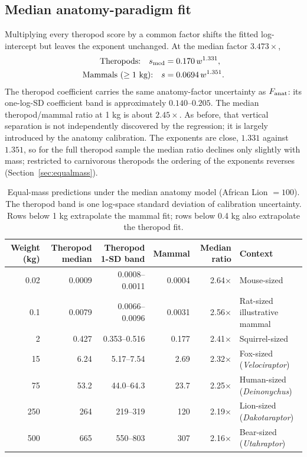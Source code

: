 \documentclass[11pt]{article}
\begin{document}
\subsection{Median anatomy-paradigm fit}
Multiplying every theropod score by a common factor shifts the fitted log-intercept but leaves the exponent unchanged. At the median factor $3.473\times$,
\begin{align}
\text{Theropods:}\quad s_{\rm med} &= 0.170\,w^{1.331}, \\
\text{Mammals ($\geq1$ kg):}\quad s &= 0.0694\,w^{1.351}.
\end{align}
The theropod coefficient carries the same anatomy-factor uncertainty as $F_{\rm anat}$: its one-log-SD coefficient band is approximately $0.140$--$0.205$. The median theropod/mammal ratio at 1 kg is about $2.45\times$. As before, that vertical separation is not independently discovered by the regression; it is largely introduced by the anatomy calibration. The exponents are close, $1.331$ against $1.351$, so for the full theropod sample the median ratio declines only slightly with mass; restricted to carnivorous theropods the ordering of the exponents reverses (Section~\ref{sec:equalmass}).

\begin{table}[H]
\centering
\footnotesize
\setlength{\tabcolsep}{4pt}
\begin{tabular}{rrrrrl}
\toprule
Weight (kg) & Theropod median & Theropod 1-SD band & Mammal & Median ratio & Context \\
\midrule
0.02 & 0.0009 & 0.0008--0.0011 & 0.0004 & 2.64$\times$ & Mouse-sized \\
0.1 & 0.0079 & 0.0066--0.0096 & 0.0031 & 2.56$\times$ & Rat-sized illustrative mammal \\
2 & 0.427 & 0.353--0.516 & 0.177 & 2.41$\times$ & Squirrel-sized \\
15 & 6.24 & 5.17--7.54 & 2.69 & 2.32$\times$ & Fox-sized (\textit{Velociraptor}) \\
75 & 53.2 & 44.0--64.3 & 23.7 & 2.25$\times$ & Human-sized (\textit{Deinonychus}) \\
250 & 264 & 219--319 & 120 & 2.19$\times$ & Lion-sized (\textit{Dakotaraptor}) \\
500 & 665 & 550--803 & 307 & 2.16$\times$ & Bear-sized (\textit{Utahraptor}) \\
\bottomrule
\end{tabular}
\caption{Equal-mass predictions under the median anatomy model (African Lion $=100$). The theropod band is one log-space standard deviation of calibration uncertainty. Rows below 1 kg extrapolate the mammal fit; rows below 0.4 kg also extrapolate the theropod fit.}
\label{tab:darkera}
\end{table}
\end{document}
